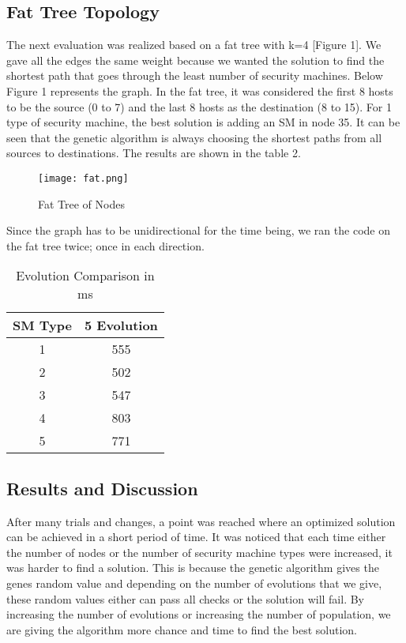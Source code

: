 \documentclass{article}
\begin{document}
\subsection{Fat Tree Topology }
The next evaluation was  realized based on a fat tree with k=4 [Figure 1]. We gave all the edges the same weight because we wanted the solution to find the shortest path that goes through the least number of security machines. Below Figure 1 represents the graph. In the fat tree, it was considered the first 8 hosts to be the source (0 to 7) and the last 8 hosts as the destination (8 to 15). For 1 type of security machine, the best solution is adding an SM in node 35. It can be seen that the genetic algorithm is always choosing the shortest paths from all sources to destinations. The results are shown in the table 2.\\
\begin{figure}[h]
	\caption{Fat Tree of Nodes}
	\centering
	\texttt{[image: fat.png]}
\end{figure}
Since the graph has to be unidirectional for the time being, we ran the code on the fat tree twice; once in each direction.
\begin{table}
	\centering
	\begin{tabular}{|c|c|}\hline
		SM Type & 5 Evolution  \\\hline\hline
		1 & 555  \\
		2 & 502  \\
		3 & 547  \\
		4 & 803  \\
		5 & 771  \\\hline
	\end{tabular}
	
	\caption{Evolution Comparison in ms}
	\label{Evolution Comparison}
\end{table}


\subsection{Results and Discussion}

After many trials and changes, a point was reached where an optimized solution can be achieved in a short period of time. It was noticed that each time either the number of nodes or the number of security machine types were increased, it was harder to find a solution. This is because the genetic algorithm gives the genes random value and depending on the number of evolutions that we give, these random values either can pass all checks or the solution will fail. By increasing the number of evolutions or increasing the number of population, we are giving the algorithm more chance and time to find the best solution.\\
\end{document}
